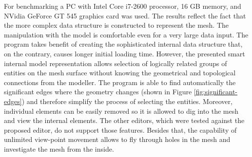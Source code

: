 For benchmarking a PC with Intel Core i7-2600 processor, 16 GB memory, and NVidia GeForce GT 545 graphics card was used. The results reflect the fact that the more complex data structure is constructed to represent the mesh. The manipulation with the model is comfortable even for a very large data input. The program takes benefit of creating the sophisticated internal data structure that, on the contrary, causes longer initial loading time. However, the presented smart internal model representation allows selection of logically related groups of entities on the mesh surface without knowing the geometrical and topological connections from the modeller. The program is able to find automatically the significant edges where the geometry changes (shown in Figure \ref{fig:significant-edges}) and therefore simplify the process of selecting the entities. Moreover, individual elements can be easily removed so it is allowed to dig into the mesh and view the internal elements. The other editors, which were tested against the proposed editor, do not support those features. Besides that, the capability of unlimited view-point movement allows to fly through holes in the mesh and investigate the mesh from the inside.